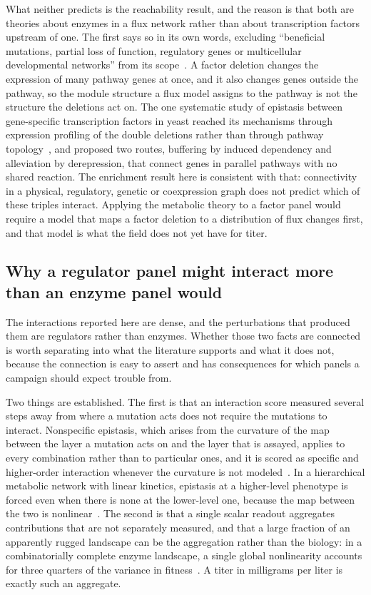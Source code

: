 What neither predicts is the reachability result, and the reason is that both are theories
about enzymes in a flux network rather than about transcription factors upstream of one.
The first says so in its own words, excluding ``beneficial mutations, partial loss of
function, regulatory genes or multicellular developmental
networks'' from its scope~\citep{segreModularEpistasisYeast2005}. A factor deletion
changes the expression of many pathway genes at once, and it also changes genes outside
the pathway, so the module structure a flux model assigns to the pathway is not the
structure the deletions act on. The one systematic study of epistasis between
gene-specific transcription factors in yeast reached its mechanisms through expression
profiling of the double deletions rather than through pathway
topology~\citep{sameithHighresolutionGeneExpression2015}, and proposed two routes,
buffering by induced dependency and alleviation by derepression, that connect genes in
parallel pathways with no shared reaction. The enrichment result here is consistent with
that: connectivity in a physical, regulatory, genetic or coexpression graph does not
predict which of these triples interact. Applying the metabolic theory to a factor panel
would require a model that maps a factor deletion to a distribution of flux changes first,
and that model is what the field does not yet have for titer.

\subsection*{Why a regulator panel might interact more than an enzyme panel would}

The interactions reported here are dense, and the perturbations that produced them are
regulators rather than enzymes. Whether those two facts are connected is worth separating
into what the literature supports and what it does not, because the connection is easy to
assert and has consequences for which panels a campaign should expect trouble from.

Two things are established. The first is that an interaction score measured several steps
away from where a mutation acts does not require the mutations to interact. Nonspecific
epistasis, which arises from the curvature of the map between the layer a mutation acts on
and the layer that is assayed, applies to every combination rather than to particular
ones, and it is scored as specific and higher-order interaction whenever the curvature is
not modeled~\citep{domingoCausesConsequencesGenetic2019}. In a hierarchical metabolic
network with linear kinetics, epistasis at a higher-level phenotype is forced even when
there is none at the lower-level one, because the map between the two is
nonlinear~\citep{kryazhimskiyEmergencePropagationEpistasis2021}. The second is that a
single scalar readout aggregates contributions that are not separately measured, and that
a large fraction of an apparently rugged landscape can be the aggregation rather than the
biology: in a combinatorially complete enzyme landscape, a single global nonlinearity
accounts for three quarters of the variance in
fitness~\citep{johnstonCombinatoriallyCompleteEpistatic2024}. A titer in milligrams per
liter is exactly such an aggregate.

